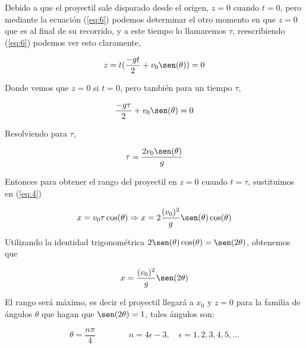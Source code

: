 \documentclass[a4paper,10pt]{article}
\begin{document}
\vspace{.3cm}

Debido a que el proyectil sale disparado desde el origen, $z=0$ cuando
$t=0$, pero mediante la ecuación (\ref{eq:6}) podemos determinar el otro
momento en que $z=0$ que es al final de su recorrido, y a este tiempo
lo llamaremos $\tau$, reescribiendo (\ref{eq:6}) podemos ver esto claramente,

\begin{equation*}
 z = t(\frac{-gt}{2} + v_0 \sen(\theta)) = 0
\end{equation*}

Donde vemos que $z=0$ si $t=0$, pero también para un tiempo $\tau$,

\begin{equation*}
 \frac{-g\tau}{2} + v_0 \sen(\theta) = 0
\end{equation*}

Resolviendo para $\tau$,

\begin{equation}
 \tau = \frac{2v_0\sen(\theta)}{g}
 \label{eq:7}
\end{equation}

Entonces para obtener el rango del proyectil en $z=0$ cuando
$t=\tau$, sustituimos en (\ref{eq:4})

\begin{equation*}
 x = v_0 \tau \cos(\theta) \Rightarrow x = 2 \frac{(v_0)^2}{g} \sen(\theta)\cos(\theta)
\end{equation*}

Utilizando la identidad trigonométrica $2\sen(\theta)\cos(\theta) = \sen (2\theta)$,
obtenemos que

\begin{equation}
 x = \frac{(v_0)^2}{g} \sen(2\theta)
 \label{eq:8}
\end{equation}

El rango será máximo, es decir el proyectil llegará a $x_0$ y $z=0$ para
la familia de ángulos $\theta$ que hagan que $\sen(2\theta)=1$, tales
ángulos son:

\begin{equation}
 \theta = \frac{n\pi}{4} \qquad \qquad n = 4\epsilon - 3, \quad  \epsilon = 1,2,3,4,5,\dots
 \label{eq:9}
\end{equation}
\end{document}
